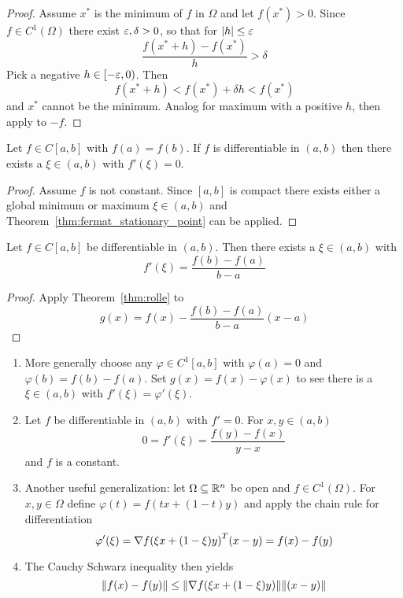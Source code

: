\begin{proof}
Assume \( x^* \) is the minimum of \( f \) in \( \Omega \) and let \( f(x^*) > 0 \). 
Since \( f \in C^1(\Omega) \) there exist \( \varepsilon, \delta > 0 \), so that for \( |h| \le \varepsilon \)
\[
    \frac{f(x^* + h) - f(x^*)}{h} > \delta
\]
Pick a negative \( h \in [-\varepsilon, 0) \). Then 
\[
     f(x^* + h) < f(x^*) +  \delta h < f(x^*) 
\]
and \( x^* \) cannot be the minimum. Analog for maximum with a positive \( h \), then apply to \( -f \).
\end{proof}
\bigskip


\begin{theorem}[Rolle]\label{thm:rolle}
Let \( f \in C[a,b] \) with \( f(a) = f(b) \). If \( f \) is differentiable in \( (a, b) \) then 
there exists a \( \xi \in (a,b) \) with \( f'(\xi) = 0 \).
\end{theorem}

\begin{proof}
Assume \( f \) is not constant. Since \( [a,b] \) is compact there exists either a global minimum or maximum 
\( \xi \in (a,b) \) and Theorem~\ref{thm:fermat_stationary_point} can be applied.
\end{proof}
\bigskip


\begin{theorem}\label{thm:mean_value}
Let \( f \in C[a,b] \) be differentiable in \( (a, b) \). Then there exists a \( \xi \in (a,b) \) with 
\[
    f'(\xi) = \frac{f(b) - f(a)}{b - a}
\]
\end{theorem}

\begin{proof}
Apply Theorem~\ref{thm:rolle} to 
\[
    g(x) = f(x) - \frac{f(b) - f(a)}{b - a} (x -a) 
\]
\end{proof}
\bigskip


\begin{remark}\hfill
    \begin{enumerate}
        \item More generally choose any \( \varphi \in C^1[a,b] \) with \( \varphi(a) = 0 \) and 
            \( \varphi(b) = f(b) - f(a) \). Set \( g(x) = f(x) - \varphi(x) \) to see there is a \( \xi \in (a,b) \) 
            with \( f'(\xi) = \varphi'(\xi)\). 
        \item Let \( f \) be differentiable in \( (a, b) \) with \( f' = 0 \). For \( x, y \in (a, b) \)
			\[
				0 = f'(\xi) = \frac{f(y) - f(x)}{y - x}
			\]
			and \( f \) is a constant.
        \item Another useful generalization: let \( \Omega \subseteq \mathbb{R}^n \) be open and \( f \in C^1(\Omega) \). For
            \( x, y \in \Omega \) define \( \varphi(t) = f(tx + (1 - t)y) \) and apply the chain rule for differentiation
            \[
                 \varphi'(\xi) = \nabla {f(\xi x + (1 - \xi)y)}^T(x - y) = f(x) - f(y)
            \]
        \item The Cauchy Schwarz inequality then yields
            \[
                  \|f(x) - f(y)\| \le \|\nabla f(\xi x + (1 - \xi)y)\| \|(x - y)\|
            \]
    \end{enumerate}
\end{remark}
\bigskip


